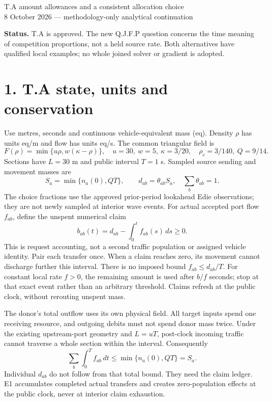 \documentclass[11pt,a4paper]{article}
\begin{document}
\begin{center}
{\Large T.A amount allowances and a consistent allocation choice}\\[4pt]
8 October 2026 --- methodology-only analytical continuation
\end{center}
\textbf{Status.} T.A is approved. The new Q.J.F.P question concerns the time
meaning of competition proportions, not a held source rate. Both alternatives
have qualified local examples; no whole joined solver or gradient is adopted.

\section*{1. T.A state, units and conservation}
Use metres, seconds and continuous vehicle-equivalent mass (eq). Density
$\rho$ has units eq/m and flow has units eq/s. The common triangular field is
\begin{equation}
 F(\rho)=\min\{u\rho,w(\kappa-\rho)\},\quad
 u=30,\ w=5,\ \kappa=3/20,\quad \rho_c=3/140,\ Q=9/14.
\end{equation}
Sections have $L=30$ m and public interval $T=1$ s. Sampled source sending and
movement masses are
\begin{equation}
 S_a=\min\{n_a(0),QT\},\qquad d_{ab}=\theta_{ab}S_a,\quad
 \sum_b\theta_{ab}=1.
\end{equation}
The choice fractions use the approved prior-period lookahead Edie observations;
they are not newly sampled at interior wave events. For actual accepted port
flow $f_{ab}$, define the unspent numerical claim
\begin{equation}
 b_{ab}(t)=d_{ab}-\int_0^t f_{ab}(s)\,ds\ge0.
\end{equation}
This is request accounting, not a second traffic population or assigned vehicle
identity. Pair each transfer once. When a claim reaches zero, its movement
cannot discharge further this interval. There is no imposed bound
$f_{ab}\le d_{ab}/T$. For constant local rate $f>0$, the remaining amount
is used after $b/f$ seconds; stop at that exact event rather than an arbitrary
threshold. Claims refresh at the public clock, without rerouting unspent mass.

The donor's total outflow uses its own physical field. All target inputs spend
one receiving resource, and outgoing debits must not spend donor mass twice.
Under the existing upstream-port geometry and $L=uT$, post-clock incoming
traffic cannot traverse a whole section within the interval. Consequently
\begin{equation}
 \sum_b\int_0^T f_{ab}\,dt\le\min\{n_a(0),QT\}=S_a.
\end{equation}
Individual $d_{ab}$ do not follow from that total bound. They need the claim
ledger. E1 accumulates completed actual transfers and creates zero-population
effects at the public clock, never at interior claim exhaustion.
\end{document}
